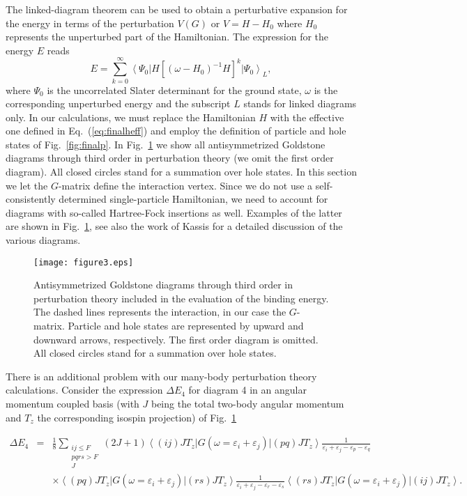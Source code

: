 \documentclass[aps,prc,twocolumn,floatfix]{revtex4}
\begin{document}
The linked-diagram theorem \cite{blaizot,lindgren} can be used to obtain a perturbative 
expansion  for the energy
in terms of the perturbation $V(G)$ or  $V=H-H_0$ where $H_0$ represents the unperturbed 
part of the Hamiltonian. The expression for the energy $E$ reads
\begin{equation}
  E = \sum_{k=0}^{\infty} \left\langle \Psi_0 \right| H\left[(\omega - H_0)^{-1}H\right]^k
      \left|\Psi_0\right\rangle_{L},
\end{equation}
where $\Psi_0$ is the uncorrelated Slater determinant for the ground state, $\omega$ is 
the corresponding  
unperturbed  energy and the subscript $L$ stands for linked diagrams only.
In our calculations, we must replace the Hamiltonian $H$ with the effective one defined
in Eq.~(\ref{eq:finalheff}) and employ the definition of particle and hole states
of Fig.~\ref{fig:finalp}.
In Fig.~\ref{fig:diagrams} we show all antisymmetrized Goldstone diagrams through third order
in perturbation theory (we omit the first order diagram). All closed circles stand for a summation
over hole states. In this section we let the  $G$-matrix define the interaction 
vertex. Since we do not use a self-consistently determined single-particle Hamiltonian, we
need to account for diagrams with so-called 
Hartree-Fock insertions as well. Examples of the latter are
shown in Fig.~\ref{fig:diagrams}, see also the work of Kassis \cite{kassis72} for a detailed
discussion of the various diagrams.
\begin{figure}[hbpt]
\vspace{0.25in}
\texttt{[image: figure3.eps]}
\caption{Antisymmetrized Goldstone diagrams through third order in perturbation 
theory included
in the evaluation of the binding energy. The dashed lines represents the interaction, in our case the 
$G$-matrix.
Particle and hole states are represented by upward  and downward arrows, respectively.
The first order diagram is omitted. All closed circles stand for a summation
over hole states.}
\label{fig:diagrams}
\end{figure}
There is an additional problem with our 
many-body perturbation theory calculations. Consider the expression $\Delta E_4$
for diagram 4 in an angular momentum coupled basis (with  $J$ being the total two-body angular
momentum and $T_z$ the corresponding isospin projection)
of Fig.~\ref{fig:diagrams}
\begin{widetext}
\begin{eqnarray}
\Delta E_4 &=& \frac{1}{8}\sum_{\begin{array}{c}ij\leq F\\ pqrs > F\\ J\end{array}}(2J+1)
\left\langle (ij)JT_z\right | G(\omega=\varepsilon_i+\varepsilon_j) \left | (pq)JT_z 
\right\rangle\frac{1}{\varepsilon_i+\varepsilon_j-\varepsilon_p-\varepsilon_q} \\ \nonumber 
&& \times \left\langle (pq)JT_z\right | G(\omega=\varepsilon_i+\varepsilon_j) \left | (rs)JT_z
\right\rangle\frac{1}{\varepsilon_i+\varepsilon_j-\varepsilon_r-\varepsilon_s}
\left\langle (rs)JT_z\right | G(\omega=\varepsilon_i+\varepsilon_j) \left | (ij)JT_z
\right\rangle.
\end{eqnarray}
\end{widetext}
\end{document}

